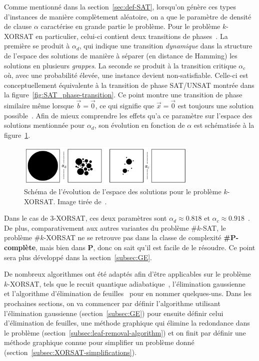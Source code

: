 Comme mentionné dans la section~\ref{sec:def-SAT}, lorsqu'on génère ces types d'instances de manière complètement aléatoire, on a que le paramètre de densité de clause $\alpha$ caractérise en grande partie le problème.
Pour le problème $k$-XORSAT en particulier, celui-ci contient deux transitions de phases~\cite{mezard_alternative_2002}.
La première se produit à $\alpha_d$, qui indique une transition \emph{dynamique} dans la structure de l'espace des solutions de manière à séparer (en distance de Hamming) les solutions en plusieurs \emph{grappes}.
La seconde se produit à la transition critique $\alpha_c$ où, avec une probabilité élevée, une instance devient non-satisfiable.
Celle-ci est conceptuellement équivalente à la transition de phase SAT/UNSAT montrée dans la figure~\ref{fig:SAT_phase-transition}.
Ce point montre une transition de phase similaire même lorsque $\vec{b} = \vec{0}$, ce qui signifie que $\vec{x} = \vec{0}$ est toujours une solution possible~\cite{ricci2001simplest}.
Afin de mieux comprendre les effets qu'a ce paramètre sur l'espace des solutions mentionnée pour $\alpha_d$, son évolution en fonction de $\alpha$ est schématisée à la figure~\ref{fig:solution-space}.
\begin{figure}[h]
    \centering
    \includegraphics[width=0.77\textwidth]{Figures/solution_space_evolution.jpeg}
    \caption[L'évolution de l'espace des solutions pour le problème \mbox{$k$-XORSAT}.]{Schéma de l'évolution de l'espace des solutions pour le problème \mbox{$k$-XORSAT}. Image tirée de~\protect\cite{moore_nature_2011}.}
    \label{fig:solution-space}
\end{figure}
Dans le cas de $3$-XORSAT, ces deux paramètres sont $\alpha_d \approx 0.818$ et $\alpha_c \approx 0.918$~\cite{mezard_alternative_2002}.
De plus, comparativement aux autres variantes du problème \#$k$-SAT, le problème \#$k$-XORSAT ne se retrouve pas dans la classe de complexité \textbf{\#P-complète}, mais bien dans \textbf{P}, donc on sait qu'il est facile de le résoudre.
Ce point sera plus développé dans la section~\ref{subsec:GE}.

De nombreux algorithmes ont été adaptés afin d'être applicables sur le problème $k$-XORSAT, tels que le recuit quantique adiabatique~\cite{patil_obstacles_2019}, l'élimination gaussienne~\cite{braunstein_complexity_2002} et l'algorithme d'élimination de feuilles~\cite{mezard_alternative_2002} pour en nommer quelques-uns.
Dans les prochaines sections, on va commencer par définir l'algorithme utilisant l'élimination gaussienne (section~\ref{subsec:GE}) pour ensuite définir celui d'élimination de feuilles, une méthode graphique qui élimine la redondance dans le problème (section~\ref{subsec:leaf-removal-algorithm}) et on finit par définir une méthode graphique connue pour simplifier un problème donné (section~\ref{subsec:XORSAT-simplifications}).

